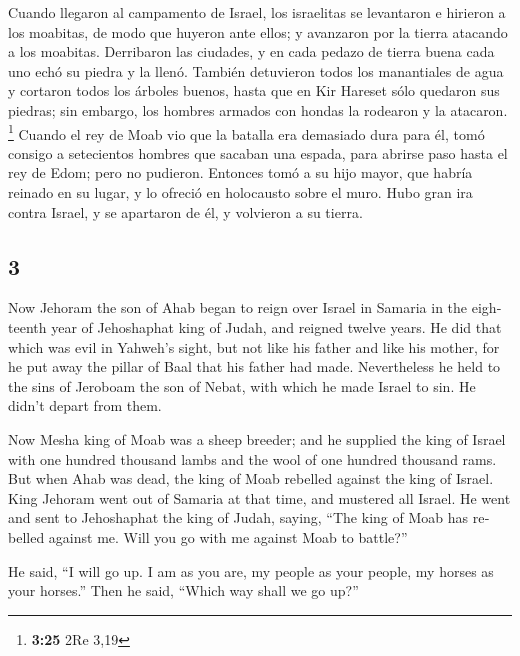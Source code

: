 \begin{paracol}{2}
 Cuando llegaron al campamento de Israel, los israelitas
se levantaron e hirieron a los moabitas, de modo que huyeron ante ellos;
y avanzaron por la tierra atacando a los moabitas. 
Derribaron las ciudades, y en cada pedazo de tierra buena cada uno echó
su piedra y la llenó. También detuvieron todos los manantiales de agua y
cortaron todos los árboles buenos, hasta que en Kir Hareset sólo
quedaron sus piedras; sin embargo, los hombres armados con hondas la
rodearon y la atacaron. \footnote{\textbf{3:25} 2Re 3,19}
 Cuando el rey de Moab vio que la batalla era demasiado
dura para él, tomó consigo a setecientos hombres que sacaban una espada,
para abrirse paso hasta el rey de Edom; pero no pudieron.
 Entonces tomó a su hijo mayor, que habría reinado en su
lugar, y lo ofreció en holocausto sobre el muro. Hubo gran ira contra
Israel, y se apartaron de él, y volvieron a su tierra.

\switchcolumn
\begin{otherlanguage}{english}

\hypertarget{section-5}{%
\section{3}\label{section-5}}

 Now Jehoram the son of Ahab began to reign over Israel in
Samaria in the eighteenth year of Jehoshaphat king of Judah, and reigned
twelve years.  He did that which was evil in Yahweh's
sight, but not like his father and like his mother, for he put away the
pillar of Baal that his father had made.  Nevertheless he
held to the sins of Jeroboam the son of Nebat, with which he made Israel
to sin. He didn't depart from them.

 Now Mesha king of Moab was a sheep breeder; and he
supplied the king of Israel with one hundred thousand lambs and the wool
of one hundred thousand rams.  But when Ahab was dead, the
king of Moab rebelled against the king of Israel.  King
Jehoram went out of Samaria at that time, and mustered all Israel.
 He went and sent to Jehoshaphat the king of Judah,
saying, ``The king of Moab has rebelled against me. Will you go with me
against Moab to battle?''

He said, ``I will go up. I am as you are, my people as your people, my
horses as your horses.''  Then he said, ``Which way shall
we go up?''


\end{otherlanguage}
\end{paracol}
